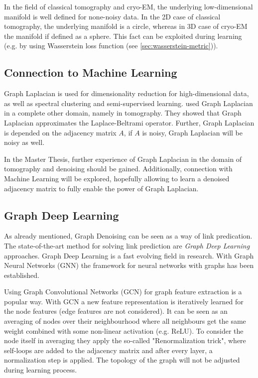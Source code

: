 \begin{tcolorbox}[colback=red!5!white,colframe=red!75!black]
    In the field of classical tomography and cryo-EM, the underlying low-dimensional manifold is well defined for none-noisy data.
    In the 2D case of classical tomography, the underlying manifold is a circle, whereas in 3D case of cryo-EM the manifold
    if defined as a sphere.
    This fact can be exploited during learning (e.g. by using Wasserstein loss function (see \ref{sec:wasserstein-metric})).
\end{tcolorbox}


\subsection{Connection to Machine Learning}

Graph Laplacian is used for dimensionality reduction for high-dimensional data, as well as spectral clustering and semi-supervised learning.
\citet{LaplaceRandomProjections} used Graph Laplacian in a complete other domain, namely in tomography. 
They showed that Graph Laplacian approximates the Laplace-Beltrami operator.
Further, Graph Laplacian is depended on the adjacency matrix $A$, if $A$ is noisy, Graph Laplacian will be noisy as well.


\begin{tcolorbox}[colback=red!5!white,colframe=red!75!black]
    In the Master Thesis, further experience of Graph Laplacian in the domain of tomography and denoising
    should be gained. Additionally, connection with Machine Learning will be explored, hopefully allowing to learn a denoised 
    adjacency matrix to fully enable the power of Graph Laplacian.
\end{tcolorbox}


\subsection{Graph Deep Learning}
As already mentioned, Graph Denoising can be seen as a way of link predication. 
The state-of-the-art method for solving link prediction are \textit{Graph Deep Learning} approaches.
Graph Deep Learning is a fast evolving field in research. With Graph Neural Networks (GNN) \cite{GNN} the framework
for neural networks with graphs has been established. 

Using Graph Convolutional Networks (GCN) \cite{GCN} for graph feature extraction is a popular way. 
With GCN a new feature representation is iteratively learned for the node features (edge features are not considered).
It can be seen as an averaging of nodes over their neighbourhood where all neighbours get the same weight combined with some non-linear activation (e.g. ReLU). 
To consider the node itself in averaging they apply the so-called "Renormalization trick", where self-loops are added to the 
adjacency matrix and after every layer, a normalization step is applied. 
The topology of the graph will not be adjusted during  learning process.

